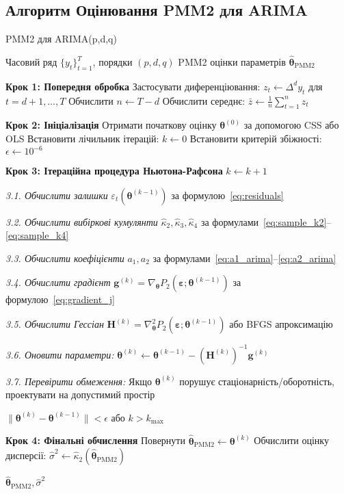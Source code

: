 \documentclass[12pt,a4paper]{article}
\begin{document}
\subsection{Алгоритм Оцінювання PMM2 для ARIMA}
\label{subsec:algorithm}

\begin{algorithm}[H]
\caption{PMM2 для ARIMA(p,d,q)}
\label{alg:pmm2_arima}
\begin{algorithmic}[1]
\REQUIRE Часовий ряд $\{y_t\}_{t=1}^T$, порядки $(p, d, q)$
\ENSURE PMM2 оцінки параметрів $\hat{\boldsymbol{\theta}}_{\text{PMM2}}$

\STATE \textbf{Крок 1: Попередня обробка}
\STATE Застосувати диференціювання: $z_t \leftarrow \Delta^d y_t$ для $t = d+1, \ldots, T$
\STATE Обчислити $n \leftarrow T - d$
\STATE Обчислити середнє: $\bar{z} \leftarrow \frac{1}{n}\sum_{t=1}^{n} z_t$

\STATE \textbf{Крок 2: Ініціалізація}
\STATE Отримати початкову оцінку $\boldsymbol{\theta}^{(0)}$ за допомогою CSS або OLS
\STATE Встановити лічильник ітерацій: $k \leftarrow 0$
\STATE Встановити критерій збіжності: $\epsilon \leftarrow 10^{-6}$

\STATE \textbf{Крок 3: Ітераційна процедура Ньютона-Рафсона}
\REPEAT
    \STATE $k \leftarrow k + 1$

    \STATE \textit{3.1. Обчислити залишки} $\varepsilon_t(\boldsymbol{\theta}^{(k-1)})$ за формулою~\eqref{eq:residuals}

    \STATE \textit{3.2. Обчислити вибіркові кумулянти} $\hat{\kappa}_2, \hat{\kappa}_3, \hat{\kappa}_4$ за формулами~\eqref{eq:sample_k2}--\eqref{eq:sample_k4}

    \STATE \textit{3.3. Обчислити коефіцієнти} $a_1, a_2$ за формулами~\eqref{eq:a1_arima}--\eqref{eq:a2_arima}

    \STATE \textit{3.4. Обчислити градієнт} $\mathbf{g}^{(k)} = \nabla_{\boldsymbol{\theta}} P_2(\boldsymbol{\varepsilon}; \boldsymbol{\theta}^{(k-1)})$ за формулою~\eqref{eq:gradient_j}

    \STATE \textit{3.5. Обчислити Гессіан} $\mathbf{H}^{(k)} = \nabla^2_{\boldsymbol{\theta}} P_2(\boldsymbol{\varepsilon}; \boldsymbol{\theta}^{(k-1)})$ або BFGS апроксимацію

    \STATE \textit{3.6. Оновити параметри:} $\boldsymbol{\theta}^{(k)} \leftarrow \boldsymbol{\theta}^{(k-1)} - (\mathbf{H}^{(k)})^{-1} \mathbf{g}^{(k)}$

    \STATE \textit{3.7. Перевірити обмеження:} Якщо $\boldsymbol{\theta}^{(k)}$ порушує стаціонарність/оборотність, проектувати на допустимий простір

\UNTIL $\|\boldsymbol{\theta}^{(k)} - \boldsymbol{\theta}^{(k-1)}\| < \epsilon$ або $k > k_{\max}$

\STATE \textbf{Крок 4: Фінальні обчислення}
\STATE Повернути $\hat{\boldsymbol{\theta}}_{\text{PMM2}} \leftarrow \boldsymbol{\theta}^{(k)}$
\STATE Обчислити оцінку дисперсії: $\hat{\sigma}^2 \leftarrow \hat{\kappa}_2(\hat{\boldsymbol{\theta}}_{\text{PMM2}})$

\RETURN $\hat{\boldsymbol{\theta}}_{\text{PMM2}}, \hat{\sigma}^2$
\end{algorithmic}
\end{algorithm}
\end{document}
